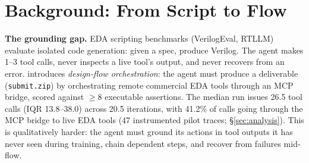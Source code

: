 \section{Background: From Script to Flow}
\label{sec:background}

\textbf{The grounding gap.} EDA scripting benchmarks (VerilogEval, RTLLM) evaluate isolated code generation: given a spec, produce Verilog. The agent makes 1--3 tool calls, never inspects a live tool's output, and never recovers from an error. \bench{} introduces \emph{design-flow orchestration}: the agent must produce a deliverable (\texttt{submit.zip}) by orchestrating remote commercial EDA tools through an MCP bridge, scored against $\geq 8$ executable assertions. The median run issues 26.5 tool calls (IQR 13.8--38.0) across 20.5 iterations, with 41.2\% of calls going through the MCP bridge to live EDA tools (47 instrumented pilot traces; \S\ref{sec:analysis}). This is qualitatively harder: the agent must ground its actions in tool outputs it has never seen during training, chain dependent steps, and recover from failures mid-flow.

